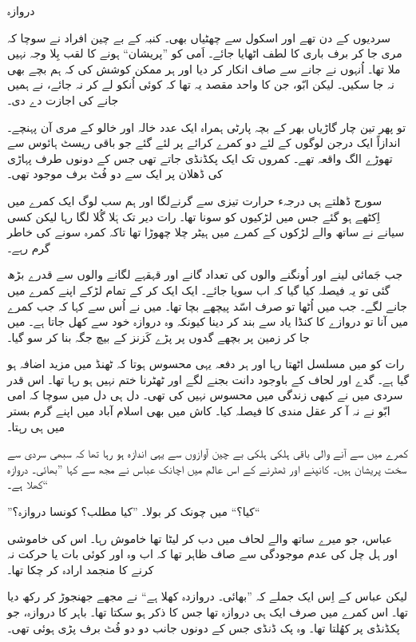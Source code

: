 \documentclass{article}
\begin{document}
\begin{center} \Large
   دروازہ
\end{center}

سردیوں کے دن تھے اور اسکول سے چھٹیاں بھی۔ کنبہ کے بے چین افراد نے سوچا کہ مری جا کر برف باری کا لطف اٹھایا جائے۔ اَمی کو ''پریشان`` ہونے کا لقب بِلا وجہ نہیں ملا تھا۔ اُنہوں نے جانے سے صاف انکار کر دیا اور ہر ممکن کوشش کی کہ ہم بچے بھی نہ جا سکیں۔ لیکن ابّو، جن کا واحد مقصد یہ تھا کہ کوئی اُنکو لے کر نہ جائے، نے ہمیں جانے کی اجازت دے دی۔

تو پھر تین چار گاڑیاں بھر کے بچہ پارٹی ہمراہ ایک عدد خالہ اور خالو کے مری آن پہنچے۔ اندازاً ایک درجن لوگوں کے لئے دو کمرے کرائے پر لئے گئے جو باقی ریسٹ ہائوس سے تھوڑے الگ واقعہ تھے۔ کمروں تک ایک پکڈنڈی جاتے تھی جس کے دونوں طرف پہاڑی کی ڈھلان پر ایک سے دو فُٹ برف موجود تھی۔

سورج ڈھلتے ہی درجہء حرارت تیزی سے گرنےلگا اور ہم سب لوگ ایک کمرے میں اِکٹھے ہو گئے جس میں لڑکیوں کو سونا تھا۔ رات دیر تک ہَلا گُلا لگا رہا لیکن کسی سیانے نے ساتھ والے لڑکوں کے کمرے میں ہیٹر چلا چھوڑا تھا تاکہ کمرہ سونے کی خاطر گرم رہے۔

جب جَمائی لینے اور اُونگنے والوں کی تعداد گانے اور قہقہے لگانے والوں سے قدرے بڑھ گئی تو یہ فیصلہ کیا گیا کہ اب سویا جائے۔ ایک ایک کر کے تمام لڑکے اپنے کمرے میں جانے لگے۔ جب میں اُٹھا تو صرف اسّد پیچھے بچا تھا۔ میں نے اُس سے کہا کہ جب کمرے میں آنا تو دروازے کا کنڈا یاد سے بند کر دینا کیونکہ وہ دروازہ خود سے کھل جاتا ہے۔ میں جا کر زمین پر بچھے گدوں پر پڑے کَزنز کے بیچ جگہ بنا کر سو گیا۔

رات کو میں مسلسل اٹھتا رہا اور ہر دفعہ یہی محسوس ہوتا کہ ٹھنڈ میں مزید اضافہ ہو گیا ہے۔ گدے اور لحاف کے باوجود دانت بجنے لگے اور ٹھٹرنا ختم نہیں ہو رہا تھا۔ اس قدر سردی میں نے کبھی زندگی میں محسوس نہیں کی تھی۔ دل ہی دل میں سوچا کہ امی ابّو نے نہ آ کر عقل مندی کا فیصلہ کیا۔ کاش میں بھی اسلام آباد میں اپنے گرم بستر میں ہی رہتا۔

کمرے میں سے آنے والی باقی ہلکی ہلکی بے چین آوازوں سے یہی اندازہ ہو رہا تھا کہ سبھی سردی سے سخت پریشان ہیں۔ کانپنے اور ٹھٹرنے کے اس عالم میں اچانک عباس نے مجھ سے کہا ''بھائی۔ دروازہ کھلا ہے۔``

''کیا؟`` میں چونک کر بولا۔ ''کیا مطلب؟ کونسا دروازہ؟``

عباس، جو میرے ساتھ والے لحاف میں دب کر لیٹا تھا خاموش رہا۔ اس کی خاموشی اور ہل چل کی عدم موجودگی سے صاف ظاہر تھا کہ اب وہ اور کوئی بات یا حرکت نہ کرنے کا منجمد ارادہ کر چکا تھا۔
 
لیکن عباس کے اِس ایک جملے کہ ''بھائی۔ دروازدہ کھلا ہے`` نے مجھے جھنجوڑ کر رکھ دیا تھا۔ اس کمرے میں صرف ایک ہی دروازہ تھا جس کا ذکر ہو سکتا تھا۔ باہر کا دروازہ، جو پکڈنڈی پر کھُلتا تھا۔ وہ پک ڈنڈی جس کے دونوں جانب دو دو فُٹ برف پڑی ہوئی تھی۔
\end{document}
